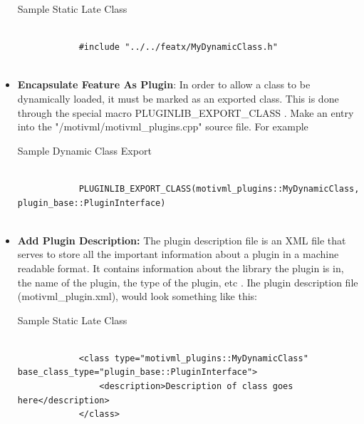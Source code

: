 \documentclass{article}
\newenvironment{longlisting}{\captionsetup{type=listing}}{}
\begin{document}
\begin{itemize}
	\begin{longlisting}
		\caption{Sample Static Late Class}
		\begin{verbatim}
			
			#include "../../featx/MyDynamicClass.h"
			
		\end{verbatim}
		\label{sampstaticlateinclude}
	\end{longlisting}

	\item \textbf{Encapsulate Feature As Plugin}: In order to allow a class to be dynamically loaded, it must be marked as an exported class. This is done through the special macro PLUGINLIB\_EXPORT\_CLASS  \cite{pluginlib}. Make an entry into the "/motivml/motivml\_plugins.cpp" source file. For example
	
	\begin{longlisting}
		\caption{Sample Dynamic Class Export}
		\begin{verbatim}
			
			PLUGINLIB_EXPORT_CLASS(motivml_plugins::MyDynamicClass, plugin_base::PluginInterface)
			
		\end{verbatim}
		\label{pluginexport}
	\end{longlisting}
	
	\item \textbf{Add Plugin Description: } The plugin description file is an XML file that serves to store all the important information about a plugin in a machine readable format. It contains information about the library the plugin is in, the name of the plugin, the type of the plugin, etc \cite{pluginlib}. Ihe plugin description file (motivml\_plugin.xml), would look something like this:
	
	\begin{longlisting}
		\caption{Sample Static Late Class}
		\begin{verbatim}
			
			<class type="motivml_plugins::MyDynamicClass" base_class_type="plugin_base::PluginInterface">
				<description>Description of class goes here</description>
			</class>
			
		\end{verbatim}
		\label{sampledylatedesc}
	\end{longlisting}
	
\end{itemize}
\end{document}
